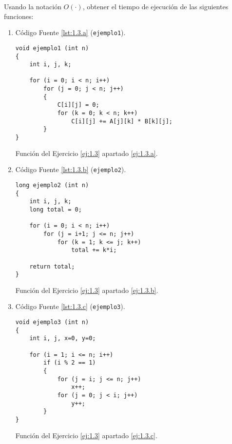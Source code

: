 \begin{ejercicio}\label{ej:1.3}
    Usando la notación $O(\cdot)$, obtener el tiempo de ejecución de las siguientes funciones:
    \begin{enumerate}
        \item \label{ej:1.3.a} Código Fuente \ref{lst:1.3.a} (\verb|ejemplo1|).
        \begin{listing}[H]
            \begin{verbatim}
void ejemplo1 (int n)
{
    int i, j, k;

    for (i = 0; i < n; i++)
        for (j = 0; j < n; j++)
        {
            C[i][j] = 0;
            for (k = 0; k < n; k++)
                C[i][j] += A[j][k] * B[k][j];
        }
}
            \end{verbatim}
            \caption{Función del Ejercicio \ref{ej:1.3} apartado \ref{ej:1.3.a}.}
            \label{lst:1.3.a}
        \end{listing}

        \item \label{ej:1.3.b} Código Fuente \ref{lst:1.3.b} (\verb|ejemplo2|).
        \begin{listing}[H]
            \begin{verbatim}
long ejemplo2 (int n)
{
    int i, j, k;
    long total = 0;

    for (i = 0; i < n; i++)
        for (j = i+1; j <= n; j++)
            for (k = 1; k <= j; k++)
                total += k*i;

    return total;
}
            \end{verbatim}
            \caption{Función del Ejercicio \ref{ej:1.3} apartado \ref{ej:1.3.b}.}
            \label{lst:1.3.b}
        \end{listing}

        \item \label{ej:1.3.c} Código Fuente \ref{lst:1.3.c} (\verb|ejemplo3|).
        \begin{listing}[H]
            \begin{verbatim}
void ejemplo3 (int n)
{
    int i, j, x=0, y=0;

    for (i = 1; i <= n; i++)
        if (i % 2 == 1)
        {
            for (j = i; j <= n; j++)
                x++;
            for (j = 0; j < i; j++)
                y++;
        }
}
            \end{verbatim}
            \caption{Función del Ejercicio \ref{ej:1.3} apartado \ref{ej:1.3.c}.}
            \label{lst:1.3.c}
        \end{listing}


\end{enumerate}
\end{ejercicio}
